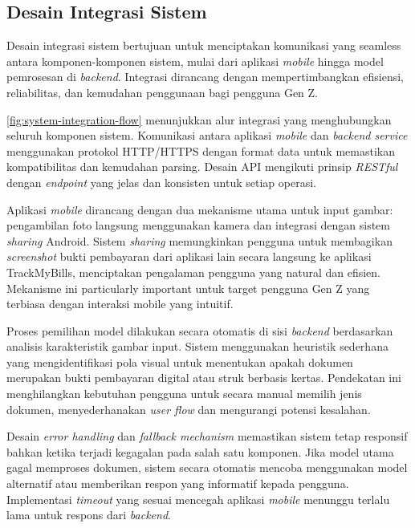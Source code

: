 \subsection{Desain Integrasi Sistem}
\label{subsec:desain-integrasi-sistem}

Desain integrasi sistem bertujuan untuk menciptakan komunikasi yang seamless antara komponen-komponen sistem, mulai dari aplikasi \textit{mobile} hingga model pemrosesan di \textit{backend}. Integrasi dirancang dengan mempertimbangkan efisiensi, reliabilitas, dan kemudahan penggunaan bagi pengguna Gen Z.


\autoref{fig:system-integration-flow} menunjukkan alur integrasi yang menghubungkan seluruh komponen sistem. Komunikasi antara aplikasi \textit{mobile} dan \textit{backend service} menggunakan protokol HTTP/HTTPS dengan format data \json{} untuk memastikan kompatibilitas dan kemudahan parsing. Desain API mengikuti prinsip \textit{RESTful} dengan \textit{endpoint} yang jelas dan konsisten untuk setiap operasi.

Aplikasi \textit{mobile} dirancang dengan dua mekanisme utama untuk input gambar: pengambilan foto langsung menggunakan kamera dan integrasi dengan sistem \textit{sharing} Android. Sistem \textit{sharing} memungkinkan pengguna untuk membagikan \emph{screenshot} bukti pembayaran dari aplikasi lain secara langsung ke aplikasi TrackMyBills, menciptakan pengalaman pengguna yang natural dan efisien. Mekanisme ini particularly important untuk target pengguna Gen Z yang terbiasa dengan interaksi mobile yang intuitif.

Proses pemilihan model dilakukan secara otomatis di sisi \textit{backend} berdasarkan analisis karakteristik gambar input. Sistem menggunakan heuristik sederhana yang mengidentifikasi pola visual untuk menentukan apakah dokumen merupakan bukti pembayaran digital atau struk berbasis kertas. Pendekatan ini menghilangkan kebutuhan pengguna untuk secara manual memilih jenis dokumen, menyederhanakan \textit{user flow} dan mengurangi potensi kesalahan.

Desain \textit{error handling} dan \textit{fallback mechanism} memastikan sistem tetap responsif bahkan ketika terjadi kegagalan pada salah satu komponen. Jika model utama gagal memproses dokumen, sistem secara otomatis mencoba menggunakan model alternatif atau memberikan respon yang informatif kepada pengguna. Implementasi \textit{timeout} yang sesuai mencegah aplikasi \textit{mobile} menunggu terlalu lama untuk respons dari \textit{backend}.

